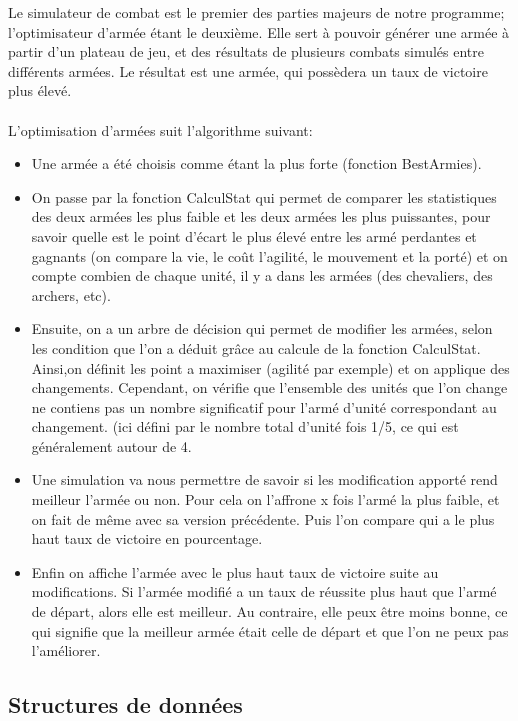 \documentclass[a4paper, 11pt]{article}
\begin{document}
Le simulateur de combat est le premier des parties majeurs de notre programme; l'optimisateur d'armée étant le deuxième. Elle sert à pouvoir générer une armée à partir d'un plateau de jeu, et des résultats de plusieurs combats simulés entre différents armées.
Le résultat est une armée, qui possèdera un taux de victoire plus élevé. \\ \\

L'optimisation d'armées suit l'algorithme suivant:

\begin{itemize}

\item Une armée a été choisis comme étant la plus forte (fonction BestArmies).
\item On passe par la fonction CalculStat qui permet de comparer les statistiques des deux armées les plus faible et les deux armées les plus puissantes, pour savoir quelle est le point d'écart le plus élevé entre les armé perdantes et gagnants (on compare la vie, le coût l'agilité, le mouvement et la porté) et on compte combien de chaque unité, il y a dans les armées (des chevaliers, des archers, etc).
\item Ensuite, on a un arbre de décision qui permet de modifier les armées, selon les condition que l'on a déduit grâce au calcule de la fonction CalculStat. 
Ainsi,on définit les point a maximiser (agilité par exemple) et on applique des changements. Cependant, on vérifie que l’ensemble des unités que l'on change ne contiens pas un nombre significatif pour l'armé d'unité correspondant au changement. (ici défini par le nombre total d'unité fois 1/5, ce qui est généralement autour de 4.
\item Une simulation va nous permettre de savoir si les modification apporté rend meilleur l'armée ou non. Pour cela on l'affrone x fois l'armé la plus faible, et on fait de même avec sa version précédente. Puis l'on compare qui a le plus haut taux de victoire en pourcentage.
\item Enfin on affiche l'armée avec le plus haut taux de victoire suite au modifications. Si l'armée modifié a un taux de réussite plus haut que l'armé de départ, alors elle est meilleur. Au contraire, elle peux être moins bonne, ce qui signifie que la meilleur armée était celle de départ et que l'on ne peux pas l'améliorer.  


\end{itemize}


\subsection{Structures de données}
\end{document}
